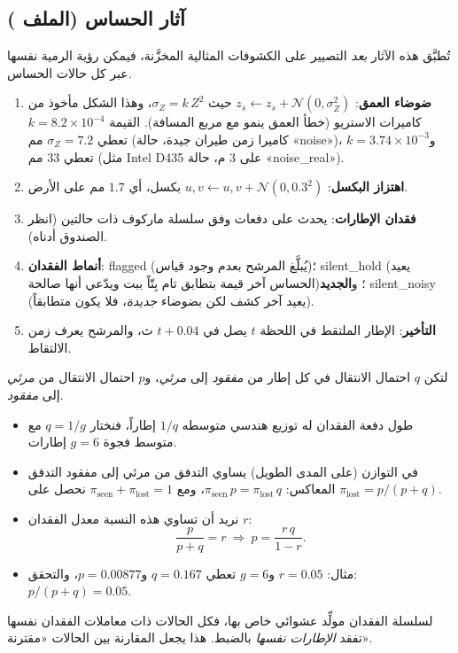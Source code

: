 \documentclass[11pt,a4paper]{article}
\newcommand{\en}[1]{\textenglish{#1}}
\newcommand{\code}[1]{\LR{\texttt{#1}}}
\begin{document}
\subsection{آثار الحساس (الملف \code{sensing/sensor.py})}
تُطبَّق هذه الآثار \emph{بعد} التصيير على الكشوفات المثالية المخزَّنة، فيمكن رؤية الرمية نفسها عبر كل حالات الحساس.
\begin{enumerate}
\item \textbf{ضوضاء العمق}: $z_s\leftarrow z_s+\mathcal N(0,\sigma_Z^2)$ حيث $\sigma_Z=k\,Z^2$، وهذا الشكل مأخوذ من كاميرات
الاستريو (خطأ العمق ينمو مع مربع المسافة). القيمة $k=8.2\times10^{-4}$ تعطي $\sigma_Z=7.2$ مم (كاميرا زمن طيران جيدة، حالة
«\en{noise}»)، و$k=3.74\times10^{-3}$ تعطي $33$ مم (مثل \en{Intel D435} على $3$ م، حالة «\en{noise\_real}»).
\item \textbf{اهتزاز البكسل}: $u,v\leftarrow u,v+\mathcal N(0,0.3^2)$ بكسل، أي $1.7$ مم على الأرض.
\item \textbf{فقدان الإطارات}: يحدث على دفعات وفق سلسلة ماركوف ذات حالتين (انظر الصندوق أدناه).
\item \textbf{أنماط الفقدان}: \en{flagged} (يُبلَّغ المرشح بعدم وجود قياس)؛ \en{silent\_hold} (يعيد الحساس آخر قيمة بتطابق تام
بِتّاً ببت ويدّعي أنها صالحة)؛ و\textbf{الجديد} \en{silent\_noisy} (يعيد آخر كشف لكن بضوضاء \emph{جديدة}، فلا يكون متطابقاً).
\item \textbf{التأخير}: الإطار الملتقط في اللحظة $t$ يصل في $t+0.04$ ث، والمرشح يعرف زمن الالتقاط.
\end{enumerate}

\begin{idea}
لتكن $q$ احتمال الانتقال في كل إطار من \emph{مفقود} إلى \emph{مرئي}، و$p$ احتمال الانتقال من \emph{مرئي} إلى \emph{مفقود}.
\begin{itemize}
\item طول دفعة الفقدان له توزيع هندسي متوسطه $1/q$ إطاراً، فنختار $q=1/g$ مع متوسط فجوة $g=6$ إطارات.
\item في التوازن (على المدى الطويل) يساوي التدفق من مرئي إلى مفقود التدفق المعاكس: $\pi_{\text{seen}}\,p=\pi_{\text{lost}}\,q$،
ومع $\pi_{\text{seen}}+\pi_{\text{lost}}=1$ نحصل على $\pi_{\text{lost}}=p/(p+q)$.
\item نريد أن تساوي هذه النسبة معدل الفقدان $r$:
\[ \frac{p}{p+q}=r\ \Rightarrow\ p=\frac{r\,q}{1-r}. \]
\item مثال: $r=0.05$ و$g=6$ تعطي $q=0.167$ و$p=0.00877$، والتحقق: $p/(p+q)=0.05$.
\end{itemize}
لسلسلة الفقدان مولِّد عشوائي خاص بها، فكل الحالات ذات معاملات الفقدان نفسها تفقد \emph{الإطارات نفسها} بالضبط. هذا يجعل
المقارنة بين الحالات «مقترنة».
\end{idea}
\end{document}
